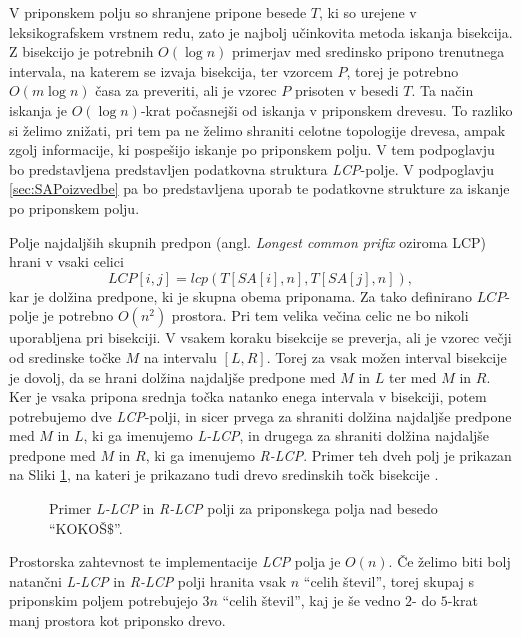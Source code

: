 V priponskem polju so shranjene pripone besede $T$, ki so urejene v leksikografskem vrstnem redu, zato je najbolj učinkovita metoda iskanja bisekcija. Z bisekcijo je potrebnih $O(\log{n})$ primerjav med sredinsko pripono trenutnega intervala, na katerem se izvaja bisekcija, ter vzorcem $P$, torej je potrebno $O(m\log{n})$ časa za preveriti, ali je vzorec $P$ prisoten v besedi $T$. Ta način iskanja je $O(\log{n})$-krat počasnejši od iskanja v priponskem drevesu. To razliko si želimo znižati, pri tem pa ne želimo shraniti celotne topologije drevesa, ampak zgolj informacije, ki pospešijo iskanje po priponskem polju. V tem podpoglavju bo predstavljena predstavljen podatkovna struktura \textit{LCP}-polje. V podpoglavju \ref{sec:SAPoizvedbe} pa bo predstavljena uporab te podatkovne strukture za iskanje po priponskem polju.

Polje najdaljših skupnih predpon (angl. \textit{Longest common prifix} oziroma LCP) hrani v vsaki celici 
    $$\textit{LCP}[i,j]=lcp(T[SA[i],n],T[SA[j],n]),$$
kar je dolžina predpone, ki je skupna obema priponama. Za tako definirano $LCP$-polje je potrebno $O(n^2)$ prostora. Pri tem velika večina celic ne bo nikoli uporabljena pri bisekciji. V vsakem koraku bisekcije se preverja, ali je vzorec večji od sredinske točke $M$ na intervalu $[L,R]$. Torej za vsak možen interval bisekcije je dovolj, da se hrani dolžina najdaljše predpone med $M$ in $L$ ter med $M$ in $R$. Ker je vsaka pripona srednja točka natanko enega intervala v bisekciji, potem potrebujemo dve \textit{LCP}-polji, in sicer prvega za shraniti dolžina najdaljše predpone med $M$ in $L$, ki ga imenujemo \textit{L-LCP}, in drugega za shraniti dolžina najdaljše predpone med $M$ in $R$, ki ga imenujemo \textit{R-LCP}. Primer teh dveh polj je prikazan na Sliki \ref{fig:RlcpLlcpSuffuxArray}, na kateri je prikazano tudi drevo sredinskih točk bisekcije \cite{Manber1990}. 

\begin{figure}[htb] 
    
    \centering
    \caption{Primer \textit{L-LCP} in \textit{R-LCP} polji za priponskega polja nad besedo \enquote{KOKOŠ$\$$}.} 
    \label{fig:RlcpLlcpSuffuxArray}
\end{figure}

Prostorska zahtevnost te implementacije \textit{LCP} polja je $O(n)$. Če želimo biti bolj natančni \textit{L-LCP} in \textit{R-LCP} polji hranita vsak $n$ \enquote{celih števil}, torej skupaj s priponskim poljem potrebujejo $3n$ \enquote{celih števil}, kaj je še vedno $2$- do $5$-krat manj prostora kot priponsko drevo.

